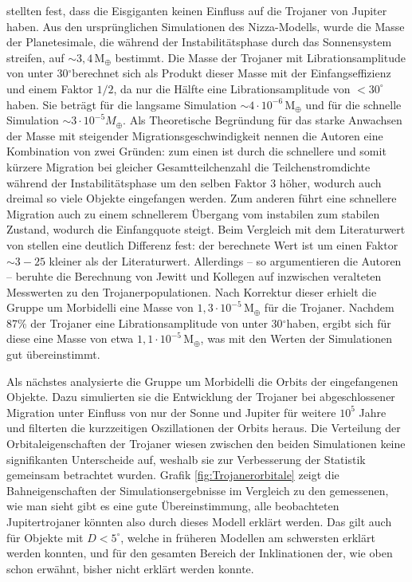 \documentclass[12pt,a4paper,twoside]{article}
\newcommand{\degree}{$^\circ$}
\newcommand{\ME}{\,\mathrm{M_\oplus}}
\begin{document}
\cite{Morbidelli2005} stellten fest, dass die Eisgiganten keinen Einfluss auf die Trojaner von Jupiter haben.
Aus den ursprünglichen Simulationen des Nizza-Modells, %
wurde die Masse der Planetesimale, die während der Instabilitätsphase durch das Sonnensystem streifen, auf $\sim 3,4 \ME$ bestimmt.
Die Masse der Trojaner mit Librationsamplitude von unter 30\degree berechnet sich als Produkt dieser Masse mit der Einfangseffizienz und einem Faktor $1/2$, da nur die Hälfte eine Librationsamplitude von $<30^\circ$ haben. Sie beträgt für die langsame Simulation $\sim4\cdot 10^{-6} \ME$ und für die schnelle Simulation $\sim 3\cdot 10^{-5} M_\oplus$.
Als Theoretische Begründung für das starke Anwachsen der Masse mit steigender Migrationsgeschwindigkeit nennen die Autoren eine Kombination von zwei Gründen:
zum einen ist durch die schnellere und somit kürzere Migration bei gleicher Gesamt\/teilchenzahl die Teilchenstromdichte während der Instabilitätsphase um den selben Faktor 3 höher, wodurch auch dreimal so viele Objekte eingefangen werden. Zum anderen führt eine schnellere Migration auch zu einem schnellerem Übergang vom instabilen zum stabilen Zustand, wodurch die Einfangquote steigt\cite{Morbidelli2005}.
Beim Vergleich mit dem Literaturwert von \cite{Jewitt2000} stellen \cite{Morbidelli2005} eine deutlich Differenz fest: der berechnete Wert ist um einen Faktor $\sim 3-25$ kleiner als der Literaturwert.
Allerdings – so argumentieren die Autoren – beruhte die Berechnung von Jewitt und Kollegen auf inzwischen veralteten Messwerten zu den Trojanerpopulationen. %
Nach Korrektur dieser erhielt die Gruppe um Morbidelli eine Masse von $1,3 \cdot 10^{-5} \ME$ für die Trojaner. Nachdem 87\% der Trojaner eine Librationsamplitude von unter 30\degree haben, ergibt sich für diese eine Masse von etwa $1,1 \cdot 10^{-5} \ME$, was mit den Werten der Simulationen gut übereinstimmt\cite{Morbidelli2005}.

Als nächstes analysierte die Gruppe um Morbidelli die Orbits der eingefangenen Objekte. Dazu simulierten sie die Entwicklung der Trojaner bei abgeschlossener Migration unter Einfluss von nur der Sonne und Jupiter für weitere $10^5$ Jahre und filterten die kurzzeitigen Oszillationen der Orbits heraus.
Die Verteilung der Orbitaleigenschaften der Trojaner wiesen zwischen den beiden Simulationen keine signifikanten Unterscheide auf, weshalb sie zur Verbesserung der Statistik gemeinsam betrachtet wurden.
Grafik \ref{fig:Trojanerorbitale} zeigt die Bahneigenschaften der Simulationsergebnisse im Vergleich zu den gemessenen, wie man sieht gibt es eine gute Übereinstimmung, alle beobachteten Jupitertrojaner könnten also durch dieses Modell erklärt werden.
Das gilt auch für Objekte mit $D<5^\circ$, welche in früheren Modellen am schwersten erklärt werden konnten\cite{Morbidelli2005}, %
und für den gesamten Bereich der Inklinationen der, wie oben schon erwähnt, bisher nicht erklärt werden konnte.
\end{document}
